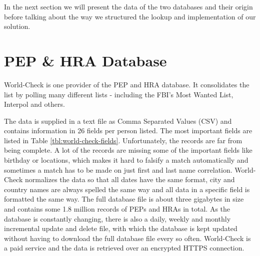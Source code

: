 \documentclass[a4paper, oneside]{csthesis}
\begin{document}
In the next section we will present the data of the two databases and their origin before talking about the way we structured the lookup and implementation of our solution.


\section{PEP \& HRA Database}


World-Check \cite{website:world-check} is one provider of the PEP and HRA database. It consolidates the list by polling many different lists - including the FBI's Most Wanted List, Interpol and others.

The data is supplied in a text file as Comma Separated Values (CSV) and contains information in 26 fields per person listed. The most important fields are listed in Table \ref{tbl:world-check-fields}. Unfortunately, the records are far from being complete. A lot of the records are missing some of the important fields like birthday or locations, which makes it hard to falsify a match automatically and sometimes a match has to be made on just first and last name correlation. World-Check normalizes the data so that all dates have the same format, city and country names are always spelled the same way and all data in a specific field is formatted the same way.
The full database file is about three gigabytes in size and contains some 1.8 million records of PEPs and HRAs in total. As the database is constantly changing, there is also a daily, weekly and monthly incremental update and delete file, with which the database is kept updated without having to download the full database file every so often.
World-Check is a paid service and the data is retrieved over an encrypted HTTPS connection.
\end{document}
